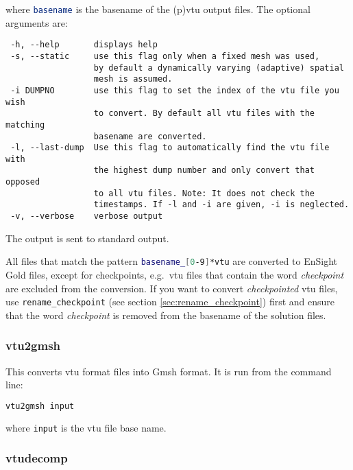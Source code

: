 where \lstinline[language = Bash]+basename+ is the basename of the (p)vtu output files. The optional arguments are:
\begin{lstlisting}
 -h, --help       displays help
 -s, --static     use this flag only when a fixed mesh was used,
                  by default a dynamically varying (adaptive) spatial
                  mesh is assumed.
 -i DUMPNO        use this flag to set the index of the vtu file you wish
                  to convert. By default all vtu files with the matching
                  basename are converted.
 -l, --last-dump  Use this flag to automatically find the vtu file with
                  the highest dump number and only convert that opposed
                  to all vtu files. Note: It does not check the
                  timestamps. If -l and -i are given, -i is neglected.
 -v, --verbose    verbose output
\end{lstlisting}

The output is sent to standard output.

All files that match the pattern \lstinline[language = Bash]+basename_[0-9]*vtu+ are converted to EnSight Gold files, except for checkpoints, e.g.~vtu files that contain the word \textsl{checkpoint} are excluded from the conversion. If you want to convert \textsl{checkpointed} vtu files, use \lstinline[language = Bash]+rename_checkpoint+ (see section \ref{sec:rename_checkpoint}) first and ensure that the word \textsl{checkpoint} is removed from the basename of the solution files.


\subsubsection{vtu2gmsh}
\label{sec:vtu2gmsh}
This converts vtu format files into Gmsh format. It is run from the command line:

\begin{lstlisting}[language = Bash]
vtu2gmsh input
\end{lstlisting}

where \lstinline+input+ is the vtu file base name.


\subsubsection{vtudecomp}
\label{sec:vtudecomp}

